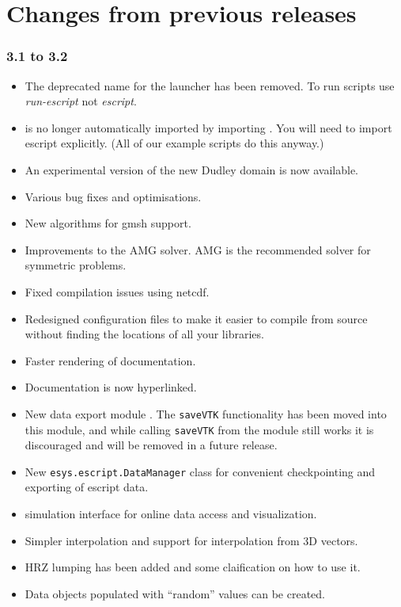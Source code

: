 
%
%
%

\chapter{Changes from previous releases}
\label{app:changes}

\subsection*{3.1 to 3.2}
\begin{itemize}
\item The deprecated name for the launcher has been removed. To run scripts use
    \emph{run-escript} not \emph{escript}.
\item \escript is no longer automatically imported by importing \finley.
    You will need to import escript explicitly. (All of our example scripts do this anyway.)
\item An experimental version of the new Dudley domain is now available.
\item Various bug fixes and optimisations.
\item New algorithms for gmsh support.
\item Improvements to the AMG solver. AMG is the recommended solver for symmetric problems.
\item Fixed compilation issues using netcdf.
\item Redesigned configuration files to make it easier to compile from source
    without finding the locations of all your libraries.
\item Faster rendering of documentation.
\item Documentation is now hyperlinked.
\item New data export module \weipa. The \texttt{saveVTK} functionality has
    been moved into this module, and while calling \texttt{saveVTK} from the
    \escript module still works it is discouraged and will be removed in a
    future release.
\item New \texttt{esys.escript.DataManager} class for convenient checkpointing
    and exporting of escript data.
\item \VisIt simulation interface for online data access and visualization.
\item Simpler interpolation and support for interpolation from 3D vectors.
\item HRZ lumping has been added and some claification on how to use it.
\item Data objects populated with ``random'' values can be created.
\end{itemize}

